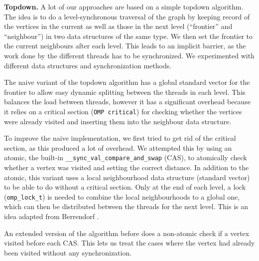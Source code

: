 \documentclass[letterpaper]{article}
\newcommand{\mypar}[1]{{\bf #1.}} %
\begin{document}
	
	\mypar{Topdown}
	A lot of our approaches are based on a simple topdown algorithm. 
	The idea is to do a level-synchronous traversal of the graph by keeping record of the vertices in the current as well as those in the next level (``frontier'' and ``neighbour'') in two data structures of the same type. 
	We then set the frontier to the current neighbours after each level. 
	This leads to an implicit barrier, as the work done by the different threads has to be synchronized. 
	We experimented with different data structures and synchronization methods.
	
	The naive variant of the topdown algorithm has a global standard vector for the frontier to allow easy dynamic splitting between the threads in each level. 
	This balances the load between threads, however it has a significant overhead because it relies on a critical section (\verb+OMP critical+) for checking whether the vertices were already visited and inserting them into the neighbour data structure.
	
	To improve the naive implementation, we first tried to get rid of the critical section, as this produced a lot of overhead. 
	We attempted this by using an atomic, the built-in \verb+__sync_val_compare_and_swap+ (CAS), to atomically check whether a vertex was visited and setting the correct distance. 
	In addition to the atomic, this variant uses a local neighbourhood data structure (standard vector) to be able to do without a critical section. 
	Only at the end of each level, a lock (\verb+omp_lock_t+) is needed to combine the local neighbourhoods to a global one, which can then be distributed between the threads for the next level. 
	This is an idea adapted from Berrendorf \cite{Berrendorf:14}.
	
	An extended version of the algorithm before does a non-atomic check if a vertex visited before each CAS. 
	This lets us treat the cases where the vertex had already been visited without any synchronization.
	
\end{document}
